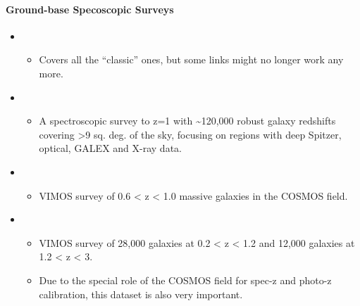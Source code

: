 \documentclass[letterpaper,10pt,english]{sphinxmanual}
\begin{document}
\paragraph{Ground-base Specoscopic Surveys}
\label{\detokenize{resource/astro/topics/extragalactic_astronomy:ground-base-specoscopic-surveys}}\begin{itemize}
\item {} 
\begin{itemize}
\item {} 
Covers all the “classic” ones, but some links might no longer work
any more.

\end{itemize}

\item {} 
\begin{itemize}
\item {} 
A spectroscopic survey to z=1 with \textasciitilde{}120,000 robust galaxy
redshifts covering \textgreater{}9 sq. deg. of the sky, focusing on regions
with deep Spitzer, optical, GALEX and X-ray data. 

\end{itemize}

\item {} 
\begin{itemize}
\item {} 
VIMOS survey of 0.6 \textless{} z \textless{} 1.0 massive galaxies in the COSMOS
field. 

\end{itemize}

\item {} 
\begin{itemize}
\item {} 
VIMOS survey of 28,000 galaxies at 0.2 \textless{} z \textless{} 1.2 and 12,000
galaxies at 1.2 \textless{} z \textless{} 3. 

\item {} 
Due to the special role of the COSMOS field for spec-z and photo-z
calibration, this dataset is also very important.


\end{itemize}
\end{itemize}
\end{document}
